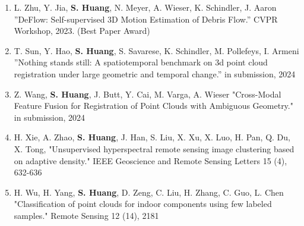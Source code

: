 \begin{enumerate}
    \item L. Zhu, Y. Jia, \textbf{S. Huang}, N. Meyer, A. Wieser, K. Schindler, J. Aaron ”DeFlow: Self-supervised 3D Motion Estimation of Debris Flow.” CVPR Workshop, 2023. (Best Paper Award)
    \item T. Sun, Y. Hao, \textbf{S. Huang}, S. Savarese, K. Schindler, M. Pollefeys, I. Armeni ”Nothing stands still: A spatiotemporal benchmark on 3d point cloud registration under large geometric and temporal change.” in submission, 2024
    \item Z. Wang, \textbf{S. Huang}, J. Butt, Y. Cai, M. Varga, A. Wieser "Cross-Modal Feature Fusion for Registration of Point Clouds with Ambiguous Geometry." in submission, 2024
    \item H. Xie, A. Zhao, \textbf{S. Huang}, J. Han, S. Liu, X. Xu, X. Luo, H. Pan, Q. Du, X. Tong, "Unsupervised hyperspectral remote sensing image clustering based on adaptive density." IEEE Geoscience and Remote Sensing Letters 15 (4), 632-636
    \item H. Wu, H. Yang, \textbf{S. Huang}, D. Zeng, C. Liu, H. Zhang, C. Guo, L. Chen "Classification of point clouds for indoor components using few labeled samples." Remote Sensing 12 (14), 2181
\end{enumerate}
